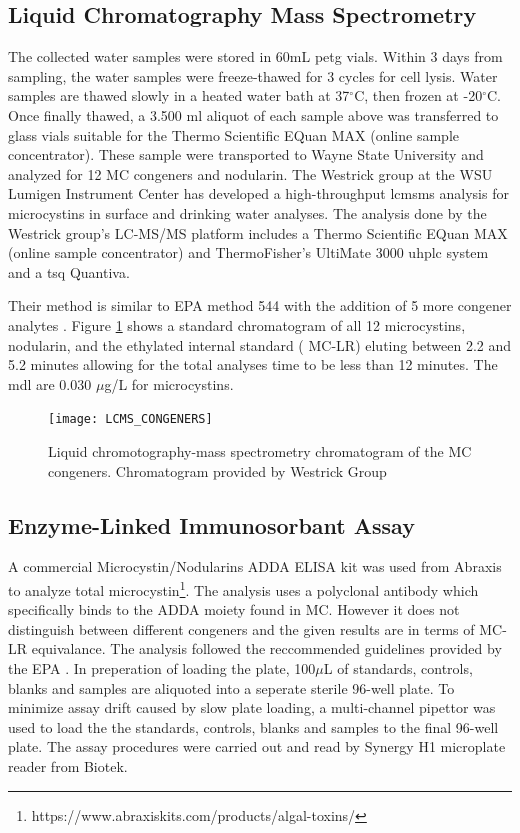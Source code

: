 \clearpage
\newpage


\subsection{Liquid Chromatography Mass Spectrometry} \label{sc:lcms}

The collected water samples were stored in 60mL \gls{petg} vials. Within 3 days from sampling, the water samples were freeze-thawed for 3 cycles for cell lysis. Water samples are thawed slowly in a heated water bath at 37$^\circ$C, then frozen at -20$^\circ$C. Once finally thawed,
a 3.500 ml aliquot of each sample above was transferred to glass vials suitable for the Thermo Scientific EQuan MAX (online sample concentrator).
These sample were transported to Wayne State University  and analyzed for 12 MC congeners and nodularin.  The Westrick group at the WSU Lumigen Instrument Center has developed a high-throughput \gls{lcmsms} analysis for microcystins in surface and drinking water analyses.
The analysis done by the Westrick group's LC-MS/MS platform includes a Thermo Scientific EQuan MAX (online sample concentrator) and ThermoFisher’s UltiMate 3000 \gls{uhplc} system and a \gls{tsq} Quantiva.

Their method is similar to EPA method 544 with the addition of 5 more congener analytes \cite{shoemaker_method_2015}. Figure \ref{fig:spectra} shows a standard chromatogram of all 12 microcystins, nodularin, and the ethylated internal standard (\ch{[C_2D_5]} MC-LR) eluting between 2.2 and 5.2 minutes allowing for the total analyses time to be less than 12 minutes.  The \gls{mdl} are 0.030  $\mu$g/L  for microcystins.

\begin{figure}[!h]
\centering
\texttt{[image: LCMS\_CONGENERS]}
\caption{Liquid chromotography-mass spectrometry chromatogram of the MC congeners. Chromatogram provided by Westrick Group}
\label{fig:spectra}
\end{figure}

\subsection{Enzyme-Linked Immunosorbant Assay}

A commercial Microcystin/Nodularins ADDA ELISA kit was used from Abraxis to analyze total microcystin\footnote{https://www.abraxiskits.com/products/algal-toxins/}. The analysis uses a polyclonal antibody which specifically binds to the ADDA moiety found in MC. However it does not distinguish between different congeners and the given results are in terms of MC-LR equivalance. The analysis followed the reccommended guidelines provided by the EPA \cite{usepa_method_2016}. In preperation of loading the plate,  100$\mu$L of standards, controls, blanks and samples are aliquoted into a seperate sterile 96-well plate. To minimize assay drift caused by slow plate loading, a multi-channel pipettor was used to load the the standards, controls, blanks and samples to the final 96-well plate. The assay procedures were carried out and read by Synergy H1 microplate reader from Biotek.

